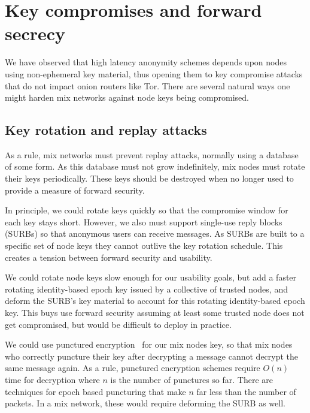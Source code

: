 \documentclass[twoside,letterpaper]{llncs}
\begin{document}


\section{Key compromises and forward secrecy}

We have observed that high latency anonymity schemes depends upon
nodes using non-ephemeral key material, thus opening them to key
compromise attacks that do not impact onion routers like Tor.
There are several natural ways one might harden mix networks against
node keys being compromised. 

\subsection{Key rotation and replay attacks}

As a rule, mix networks must prevent replay attacks, normally using
a database of some form.  As this database must not grow indefinitely,
mix nodes must rotate their keys periodically.  These keys should be
destroyed when no longer used to provide a measure of forward security.

In principle, we could rotate keys quickly so that the compromise
window for each key stays short.  However, we also must
support single-use reply blocks (SURBs) so that anonymous users can
receive messages.  As SURBs are built to a specific set of node
keys they cannot outlive the key rotation schedule.  This creates
a tension between forward security and usability.

We could rotate node keys slow enough for our usability goals, but add
a faster rotating identity-based epoch key issued by a collective of
trusted nodes, and deform the SURB's key material to account for this
rotating identity-based epoch key.
This buys use forward security
assuming at least some trusted node does not get compromised, but
would be difficult to deploy in practice. 

We could use punctured encryption~\cite{libforwardsec} for our
mix nodes key, so that mix nodes who correctly puncture their key
after decrypting a message cannot decrypt the same message again. 
As a rule, punctured encryption schemes require $O(n)$ time for
decryption where $n$ is the number of punctures so far.  There are
techniques for epoch based puncturing that make $n$ far less than
the number of packets.  In a mix network, these would require
deforming the SURB as well. 
\end{document}
